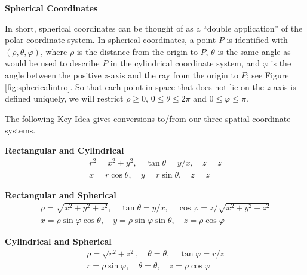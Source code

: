 \noindent\textbf{\large Spherical Coordinates}

In short, spherical coordinates can be thought of as a ``double application'' of the polar coordinate system. In spherical coordinates, a point $P$ is identified with $(\rho,\theta,\varphi)$, where $\rho$ is the distance from the origin to $P$, $\theta$ is the same angle as would be used to describe $P$ in the cylindrical coordinate system, and $\varphi$ is the angle between the positive $z$-axis and the ray from the origin to $P$; see Figure \ref{fig:sphericalintro}. So that each point in space that does not lie on the $z$-axis is defined uniquely, we will restrict $\rho \geq 0$, $0 \leq \theta \leq 2\pi$ and $0 \leq \varphi \leq \pi$.

The following Key Idea gives conversions to/from our three spatial coordinate systems.

{\textbf{Rectangular and Cylindrical}
\[
\begin{array}{c}
r^2 = x^2+y^2,\quad \tan \theta = y/x,\quad z=z\\
x=r\cos \theta, \quad y=r\sin\theta,\quad z=z
\end{array}
\]

\textbf{Rectangular and Spherical}
\[
\begin{array}{c}
\rho = \sqrt{x^2+y^2+z^2},\quad \tan \theta = y/x,\quad \cos \varphi = z/\sqrt{x^2+y^2+z^2}\\
x=\rho\sin\varphi\cos\theta,\quad y=\rho\sin\varphi\sin\theta,\quad z=\rho\cos\varphi
\end{array}
\]

\textbf{Cylindrical and Spherical }
\[
\begin{array}{c}
\rho=\sqrt{r^2+z^2}, \quad \theta = \theta,\quad \tan \varphi = r/z \\
r=\rho \sin \varphi, \quad \theta = \theta, \quad z=\rho\cos\varphi
\end{array}
\] 
}

